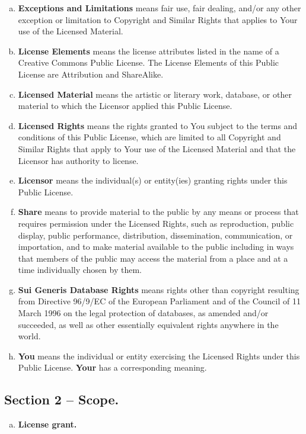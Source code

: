 {\begin{enumerate}[a.]
\item \textbf{Exceptions and Limitations} means fair use, fair dealing, and/or any other exception or limitation to Copyright and Similar Rights that applies to Your use of the Licensed Material.
\item \textbf{License Elements} means the license attributes listed in the name of a Creative Commons Public License. The License Elements of this Public License are Attribution and ShareAlike.
\item \textbf{Licensed Material} means the artistic or literary work, database, or other material to which the Licensor applied this Public License.
\item \textbf{Licensed Rights} means the rights granted to You subject to the terms and conditions of this Public License, which are limited to all Copyright and Similar Rights that apply to Your use of the Licensed Material and that the Licensor has authority to license.
\item \textbf{Licensor} means the individual(s) or entity(ies) granting rights under this Public License.
\item \textbf{Share} means to provide material to the public by any means or process that requires permission under the Licensed Rights, such as reproduction, public display, public performance, distribution, dissemination, communication, or importation, and to make material available to the public including in ways that members of the public may access the material from a place and at a time individually chosen by them.
\item \textbf{Sui Generis Database Rights} means rights other than copyright resulting from Directive 96/9/EC of the European Parliament and of the Council of 11 March 1996 on the legal protection of databases, as amended and/or succeeded, as well as other essentially equivalent rights anywhere in the world.
\item \textbf{You} means the individual or entity exercising the Licensed Rights under this Public License. \textbf{Your} has a corresponding meaning.
\end{enumerate}

\subsection*{Section 2 -- Scope.}

\begin{enumerate}[a.]
\item \textbf{License grant.}


\end{enumerate}}
